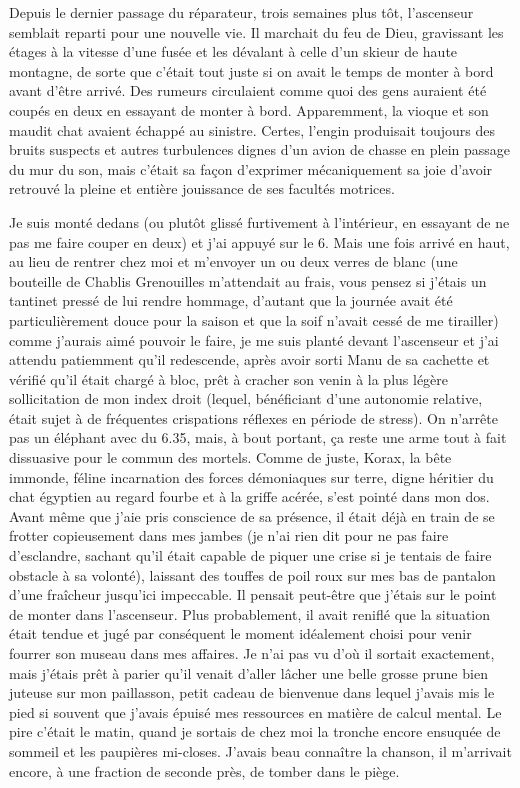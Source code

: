 Depuis le dernier passage du réparateur, trois semaines plus tôt, l’ascenseur semblait reparti pour une nouvelle vie. Il marchait du feu de Dieu, gravissant les étages à la vitesse d’une fusée et les dévalant à celle d’un skieur de haute montagne, de sorte que c’était tout juste si on avait le temps de monter à bord avant d’être arrivé. Des rumeurs circulaient comme quoi des gens auraient été coupés en deux en essayant de monter à bord. Apparemment, la vioque et son maudit chat avaient échappé au sinistre. Certes, l’engin produisait toujours des bruits suspects et autres turbulences dignes d’un avion de chasse en plein passage du mur du son, mais c’était sa façon d’exprimer mécaniquement sa joie d’avoir retrouvé la pleine et entière jouissance de ses facultés motrices.

Je suis monté dedans (ou plutôt glissé furtivement à l’intérieur, en essayant de ne pas me faire couper en deux) et j’ai appuyé sur le 6. Mais une fois arrivé en haut, au lieu de rentrer chez moi et m’envoyer un ou deux verres de blanc (une bouteille de Chablis Grenouilles m’attendait au frais, vous pensez si j’étais un tantinet pressé de lui rendre hommage, d’autant que la journée avait été particulièrement douce pour la saison et que la soif n’avait cessé de me tirailler) comme j’aurais aimé pouvoir le faire, je me suis planté devant l’ascenseur et j’ai attendu patiemment qu’il redescende, après avoir sorti Manu de sa cachette et vérifié qu’il était chargé à bloc, prêt à cracher son venin à la plus légère sollicitation de mon index droit (lequel, bénéficiant d’une autonomie relative, était sujet à de fréquentes crispations réflexes en période de stress). On n’arrête pas un éléphant avec du 6.35, mais, à bout portant, ça reste une arme tout à fait dissuasive pour le commun des mortels. Comme de juste, Korax, la bête immonde, féline incarnation des forces démoniaques sur terre, digne héritier du chat égyptien au regard fourbe et à la griffe acérée, s’est pointé dans mon dos. Avant même que j’aie pris conscience de sa présence, il était déjà en train de se frotter copieusement dans mes jambes (je n’ai rien dit pour ne pas faire d’esclandre, sachant qu’il était capable de piquer une crise si je tentais de faire obstacle à sa volonté), laissant des touffes de poil roux sur mes bas de pantalon d’une fraîcheur jusqu’ici impeccable. Il pensait peut-être que j’étais sur le point de monter dans l’ascenseur. Plus probablement, il avait reniflé que la situation était tendue et jugé par conséquent le moment idéalement choisi pour venir fourrer son museau dans mes affaires. Je n’ai pas vu d’où il sortait exactement, mais j’étais prêt à parier qu’il venait d’aller lâcher une belle grosse prune bien juteuse sur mon paillasson, petit cadeau de bienvenue dans lequel j’avais mis le pied si souvent que j’avais épuisé mes ressources en matière de calcul mental. Le pire c’était le matin, quand je sortais de chez moi la tronche encore ensuquée de sommeil et les paupières mi-closes. J’avais beau connaître la chanson, il m’arrivait encore, à une fraction de seconde près, de tomber dans le piège.

